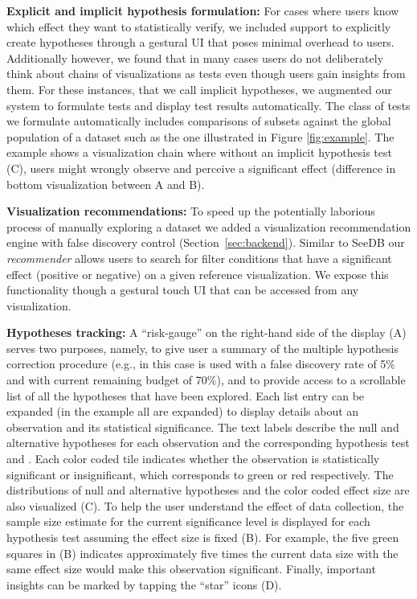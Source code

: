 \textbf{Explicit and implicit hypothesis formulation:} For cases where users know which effect they want to statistically verify, we included support to explicitly create hypotheses through a gestural UI that poses minimal overhead to users.
Additionally however, we found that in many cases users do not deliberately think about chains of visualizations as tests even though users gain insights from them.  
For these instances, that we call implicit hypotheses, we augmented our system to formulate tests and display test results automatically. The class of tests we formulate automatically includes comparisons of subsets against the global population of a dataset such as the one illustrated in Figure \ref{fig:example}. The example shows a visualization chain where without an implicit hypothesis test (C), users might wrongly observe and perceive a significant effect (difference in bottom visualization between A and B).
 
\textbf{Visualization recommendations:} To speed up the potentially laborious process of manually exploring a dataset we added a visualization recommendation engine with false discovery control (Section~\ref{sec:backend}). Similar to SeeDB \cite{seedb} our \textit{recommender} allows users to search for filter conditions that have a significant effect (positive or negative) on a given reference visualization. We expose this functionality though a gestural touch UI that can be accessed from any visualization. 

\textbf{Hypotheses tracking:} A ``risk-gauge'' on the right-hand side of the display (A) serves two purposes, namely, to give user a summary of the multiple hypothesis correction procedure (e.g., in this case \ainv{} is used with a false discovery rate of 5\% and with current remaining budget of 70\%), and to provide access to a scrollable list of all the hypotheses that have been explored.
Each list entry can be expanded (in the example all are expanded) to display details about an observation and its statistical significance.  
The text labels describe the null and alternative hypotheses for each observation and the corresponding hypothesis test and \pval{}. Each color coded tile indicates whether the observation is statistically significant or insignificant, which corresponds to green or red respectively.  
The distributions of null and alternative hypotheses and the color coded effect size are also visualized (C).  
To help the user understand the effect of data collection, the sample size estimate for the current significance level is displayed for each hypothesis test assuming the effect size is fixed (B).  
For example, the five green squares in (B) indicates approximately five times the current data size with the same effect size would make this observation significant.
Finally, important insights can be marked by tapping the ``star'' icons (D).


